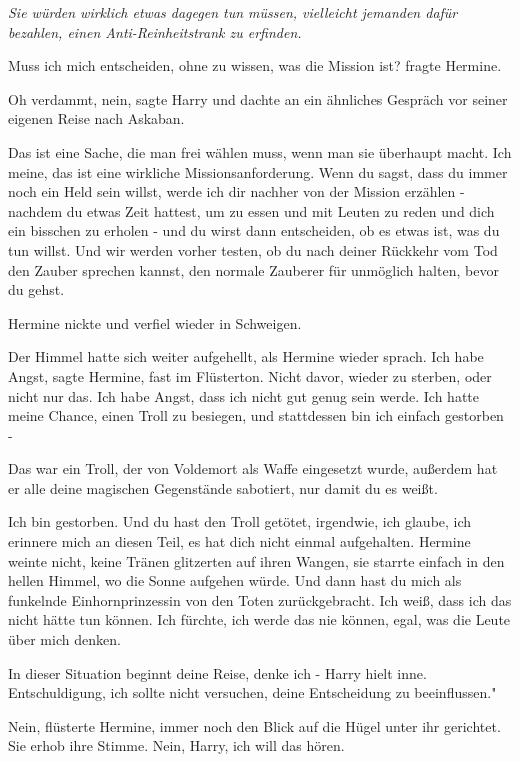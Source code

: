 \emph{Sie würden wirklich etwas dagegen tun müssen, vielleicht jemanden dafür
bezahlen, einen Anti-Reinheitstrank zu erfinden.}

\glqq{}Muss ich mich entscheiden, ohne zu wissen, was die Mission ist?\grqq{}
fragte Hermine.

\glqq{}Oh verdammt, nein\grqq{}, sagte Harry und dachte an ein ähnliches Gespräch
vor seiner eigenen Reise nach Askaban.

\glqq{}Das ist eine Sache, die man frei wählen muss, wenn man sie überhaupt
macht. Ich meine, das ist eine wirkliche Missionsanforderung. Wenn du sagst,
dass du immer noch ein Held sein willst, werde ich dir nachher von der Mission
erzählen - nachdem du etwas Zeit hattest, um zu essen und mit Leuten zu reden
und dich ein bisschen zu erholen - und du wirst dann entscheiden, ob es etwas
ist, was du tun willst. Und wir werden vorher testen, ob du nach deiner Rückkehr
vom Tod den Zauber sprechen kannst, den normale Zauberer für unmöglich halten,
bevor du gehst.\grqq{}

Hermine nickte und verfiel wieder in Schweigen.

Der Himmel hatte sich weiter aufgehellt, als Hermine wieder sprach. \glqq{}Ich
habe Angst\grqq{}, sagte Hermine, fast im Flüsterton. \glqq{}Nicht davor, wieder
zu sterben, oder nicht nur das. Ich habe Angst, dass ich nicht gut genug sein
werde. Ich hatte meine Chance, einen Troll zu besiegen, und stattdessen bin ich
einfach gestorben -\grqq{}

\glqq{}Das war ein Troll, der von Voldemort als Waffe eingesetzt wurde, außerdem
hat er alle deine magischen Gegenstände sabotiert, nur damit du es weißt.\grqq{}

\glqq{}Ich bin gestorben. Und du hast den Troll getötet, irgendwie, ich glaube,
ich erinnere mich an diesen Teil, es hat dich nicht einmal aufgehalten.\grqq{}
Hermine weinte nicht, keine Tränen glitzerten auf ihren Wangen, sie starrte
einfach in den hellen Himmel, wo die Sonne aufgehen würde. \glqq{}Und dann hast
du mich als funkelnde Einhornprinzessin von den Toten zurückgebracht. Ich weiß,
dass ich das nicht hätte tun können. Ich fürchte, ich werde das nie können,
egal, was die Leute über mich denken.\grqq{}

\glqq{}In dieser Situation beginnt deine Reise, denke ich -\grqq{} Harry hielt
inne. \glqq{}Entschuldigung, ich sollte nicht versuchen, deine Entscheidung zu
beeinflussen."

\glqq{}Nein\grqq{}, flüsterte Hermine, immer noch den Blick auf die Hügel unter
ihr gerichtet. Sie erhob ihre Stimme. \glqq{}Nein, Harry, ich will das
hören.\grqq{}

